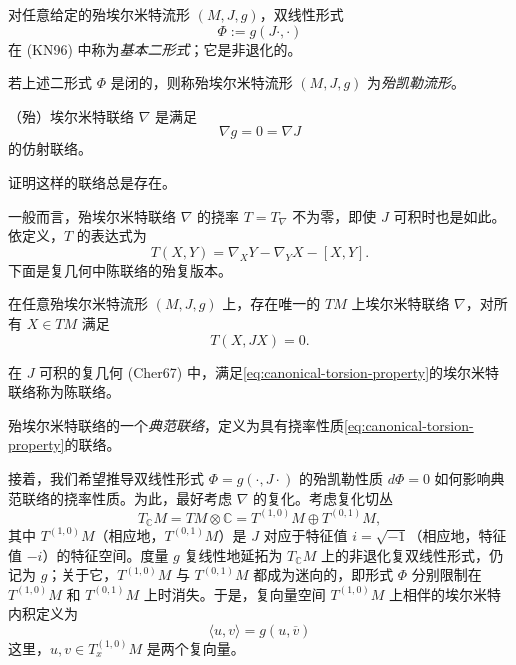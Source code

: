对任意给定的殆埃尔米特流形 $(M,J,g)$，双线性形式
\[
 \Phi:=g(J\cdot,\cdot)
\]
在 (KN96) 中称为\emph{基本二形式}；它是非退化的。

\begin{definition}\label{def:almost-kahler-manifold}
若上述二形式 $\Phi$ 是闭的，则称殆埃尔米特流形 $(M,J,g)$ 为\emph{殆凯勒流形}。
\end{definition}

\begin{definition}\label{def:almost-hermitian-connection}
（殆）埃尔米特联络 $\nabla$ 是满足
\[
 \nabla g=0=\nabla J
\]
的仿射联络。
\end{definition}

\begin{exercise}\label{ex:hermitian-connection-exists}
证明这样的联络总是存在。
\end{exercise}

一般而言，殆埃尔米特联络 $\nabla$ 的挠率 $T=T_\nabla$ 不为零，即使 $J$ 可积时也是如此。依定义，$T$ 的表达式为
\[
 T(X,Y)=\nabla_XY-\nabla_YX-[X,Y].
\]
下面是复几何中陈联络的殆复版本。

\begin{theorem}[{(Ga97), (Ko03)}]\label{thm:unique-hermitian-canonical-connection}
在任意殆埃尔米特流形 $(M,J,g)$ 上，存在唯一的 $TM$ 上埃尔米特联络 $\nabla$，对所有 $X\in TM$ 满足
\begin{equation}
 T(X,JX)=0.
 \label{eq:canonical-torsion-property}
\end{equation}
\end{theorem}

在 $J$ 可积的复几何 (Cher67) 中，满足\eqref{eq:canonical-torsion-property}的埃尔米特联络称为陈联络。

\begin{definition}\label{def:canonical-connection-torsion}
殆埃尔米特联络的一个\emph{典范联络}，定义为具有挠率性质\eqref{eq:canonical-torsion-property}的联络。
\end{definition}

接着，我们希望推导双线性形式 $\Phi=g(\cdot,J\cdot)$ 的殆凯勒性质 $d\Phi=0$ 如何影响典范联络的挠率性质。为此，最好考虑 $\nabla$ 的复化。考虑复化切丛
\[
 T_{\mathbb C}M=TM\otimes\mathbb C
 =T^{(1,0)}M\oplus T^{(0,1)}M,
\]
其中 $T^{(1,0)}M$（相应地，$T^{(0,1)}M$）是 $J$ 对应于特征值 $i=\sqrt{-1}$（相应地，特征值 $-i$）的特征空间。度量 $g$ 复线性地延拓为 $T_{\mathbb C}M$ 上的非退化复双线性形式，仍记为 $g$；关于它，$T^{(1,0)}M$ 与 $T^{(0,1)}M$ 都成为迷向的，即形式 $\Phi$ 分别限制在 $T^{(1,0)}M$ 和 $T^{(0,1)}M$ 上时消失。于是，复向量空间 $T^{(1,0)}M$ 上相伴的埃尔米特内积定义为
\begin{equation}
 \langle u,v\rangle=g(u,\overline v)
 \label{eq:hermitian-inner-product-complexified}
\end{equation}
这里，$u,v\in T_x^{(1,0)}M$ 是两个复向量。

